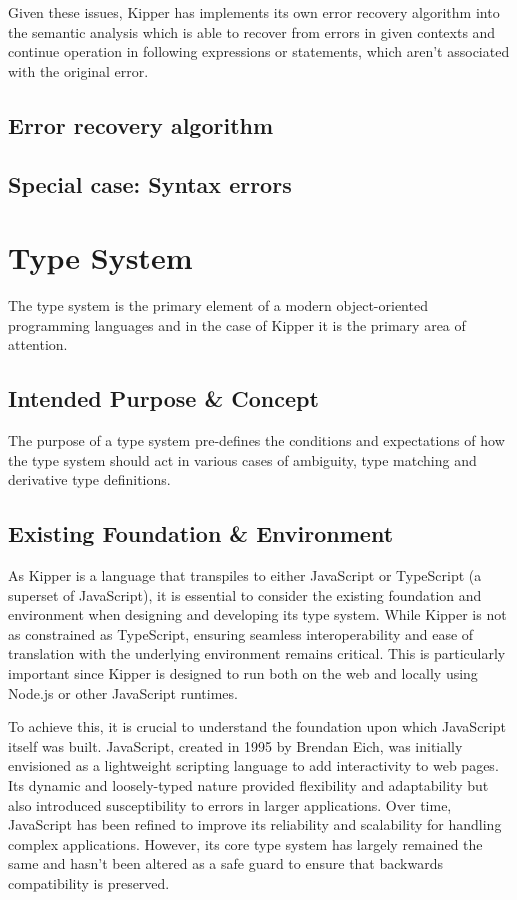 Given these issues, Kipper has implements its own error recovery algorithm into the semantic analysis which is able to recover from errors in given contexts and continue operation in following expressions or statements, which aren't associated with the original error.

\subsection{Error recovery algorithm}

\subsection{Special case: Syntax errors}

\section{Type System}

The type system is the primary element of a modern object-oriented programming languages and in the case of Kipper it is the primary area of attention.

\subsection{Intended Purpose \& Concept}

The purpose of a type system pre-defines the conditions and expectations of how the type system should act in various cases of ambiguity, type matching and derivative type definitions.

\subsection{Existing Foundation \& Environment}

As Kipper is a language that transpiles to either JavaScript or TypeScript (a superset of JavaScript), it is essential to consider the existing foundation and environment when designing and developing its type system. While Kipper is not as constrained as TypeScript, ensuring seamless interoperability and ease of translation with the underlying environment remains critical. This is particularly important since Kipper is designed to run both on the web and locally using Node.js or other JavaScript runtimes.

To achieve this, it is crucial to understand the foundation upon which JavaScript itself was built. JavaScript, created in 1995 by Brendan Eich, was initially envisioned as a lightweight scripting language to add interactivity to web pages. Its dynamic and loosely-typed nature provided flexibility and adaptability but also introduced susceptibility to errors in larger applications. Over time, JavaScript has been refined to improve its reliability and scalability for handling complex applications. However, its core type system has largely remained the same and hasn't been altered as a safe guard to ensure that backwards compatibility is preserved.

